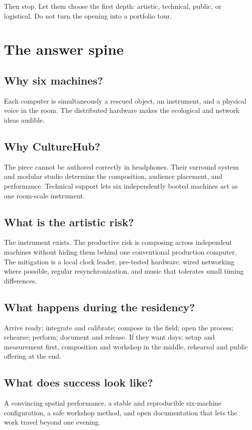 \documentclass[11pt,letterpaper]{article}
\begin{document}
Then stop. Let them choose the first depth: artistic, technical, public, or
logistical. Do not turn the opening into a portfolio tour.

\section{The answer spine}

\subsection{Why six machines?}
Each computer is simultaneously a rescued object, an instrument, and a physical
voice in the room. The distributed hardware makes the ecological and network
ideas audible.

\subsection{Why CultureHub?}
The piece cannot be authored correctly in headphones. Their surround system and
modular studio determine the composition, audience placement, and performance.
Technical support lets six independently booted machines act as one room-scale
instrument.

\subsection{What is the artistic risk?}
The instrument exists. The productive risk is composing across independent
machines without hiding them behind one conventional production computer. The
mitigation is a local clock leader, pre-tested hardware, wired networking where
possible, regular resynchronization, and music that tolerates small timing
differences.

\subsection{What happens during the residency?}
Arrive ready; integrate and calibrate; compose in the field; open the process;
rehearse; perform; document and release. If they want days: setup and measurement
first, composition and workshop in the middle, rehearsal and public offering at
the end.

\subsection{What does success look like?}
A convincing spatial performance, a stable and reproducible six-machine
configuration, a safe workshop method, and open documentation that lets the
work travel beyond one evening.
\end{document}
